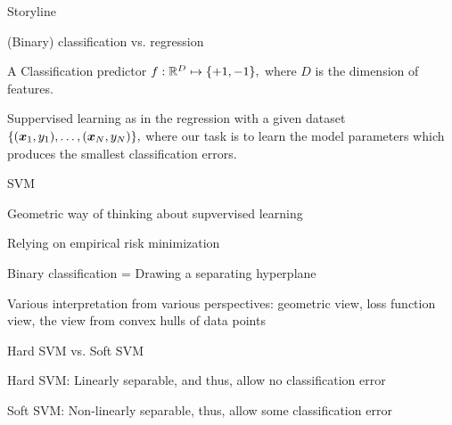 \documentclass[handout,fleqn,aspectratio=169]{beamer}
\begin{document}
\begin{frame}{Storyline}

\plitemsep 0.1in

\bci

\item (Binary) classification vs. regression

\item A Classification predictor $f:{\mathbb R}^{D} \mapsto \{+1, -1 \},$ where $D$ is the dimension of features.
\item Suppervised learning as in the regression with a given dataset $\{(\bm{x}_1,y_1), \ldots, (\bm{x}_N,y_N) \},$ where our task is to learn the model parameters which produces the smallest classification errors. 

\item SVM
\bci
\item Geometric way of thinking about supvervised learning
\item Relying on empirical risk minimization
\item Binary classification = Drawing a separating hyperplane
\item Various interpretation from various perspectives: geometric view, loss function view, the view from convex hulls of data points 
\eci
\eci
\end{frame}

\begin{frame}{Hard SVM vs. Soft SVM}


\plitemsep 0.1in

\bci

\item Hard SVM: Linearly separable, and thus, allow  no classification error 

\item Soft SVM: Non-linearly separable, thus, allow some classification error
\eci
\end{frame}
\end{document}
